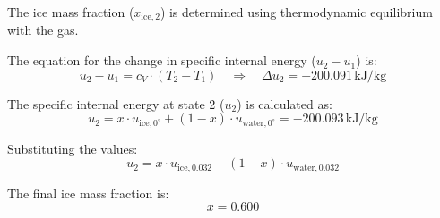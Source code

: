 The ice mass fraction (\( x_{\text{ice},2} \)) is determined using thermodynamic equilibrium with the gas.  

The equation for the change in specific internal energy (\( u_2 - u_1 \)) is:  
\[
u_2 - u_1 = c_V \cdot (T_2 - T_1) \quad \Rightarrow \quad \Delta u_2 = -200.091 \, \text{kJ/kg}
\]  

The specific internal energy at state 2 (\( u_2 \)) is calculated as:  
\[
u_2 = x \cdot u_{\text{ice},0^\circ} + (1 - x) \cdot u_{\text{water},0^\circ} = -200.093 \, \text{kJ/kg}
\]  

Substituting the values:  
\[
u_2 = x \cdot u_{\text{ice},0.032} + (1 - x) \cdot u_{\text{water},0.032}
\]  

The final ice mass fraction is:  
\[
x = 0.600
\]